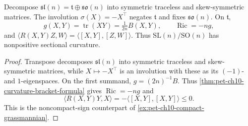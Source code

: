 \begin{example}
  \label{ex:pet-ch10-sl-so-quotient}

  Decompose $\mathfrak{sl}(n)=\mathfrak t\oplus\mathfrak{so}(n)$ into symmetric
  traceless and skew-symmetric matrices. The involution
  $\sigma(X)=-X^\top$ negates $\mathfrak t$ and fixes $\mathfrak{so}(n)$. On
  $\mathfrak t$,
  \[
    g(X,Y)=\operatorname{tr}(XY)=\tfrac1{2n}B(X,Y),\qquad
    \operatorname{Ric}=-ng,
  \]
  and $\langle R(X,Y)Z,W\rangle=\langle[X,Y],[Z,W]\rangle$. Thus
  $\mathrm{SL}(n)/\mathrm{SO}(n)$ has nonpositive sectional curvature.
\end{example}
\begin{proof}
  \sketch
  Transpose decomposes $\mathfrak{sl}(n)$ into symmetric traceless and
  skew-symmetric matrices, while $X\mapsto-X^\top$ is an involution with these
  as its $(-1)$- and $1$-eigenspaces. On the first summand,
  $g=(2n)^{-1}B$. Thus
  \cref{thm:pet-ch10-curvature-bracket-formula} gives
  $\operatorname{Ric}=-ng$ and
  \[
    \langle R(X,Y)Y,X\rangle=-\langle[X,Y],[X,Y]\rangle\le0.
  \]
  This is the noncompact-sign counterpart of
  \cref{ex:pet-ch10-compact-grassmannian}.
\end{proof}


